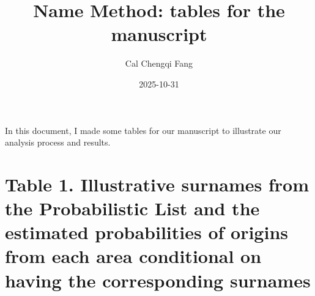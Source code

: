 \documentclass[
  landscape]{article}
\title{Name Method: tables for the manuscript}
\author{Cal Chengqi Fang}
\date{2025-10-31}
\begin{document}
\maketitle

In this document, I made some tables for our manuscript to illustrate
our analysis process and results.

\hypertarget{table-1.-illustrative-surnames-from-the-probabilistic-list-and-the-estimated-probabilities-of-origins-from-each-area-conditional-on-having-the-corresponding-surnames}{%
\section{Table 1. Illustrative surnames from the Probabilistic List and
the estimated probabilities of origins from each area conditional on
having the corresponding
surnames}\label{table-1.-illustrative-surnames-from-the-probabilistic-list-and-the-estimated-probabilities-of-origins-from-each-area-conditional-on-having-the-corresponding-surnames}}
\end{document}
